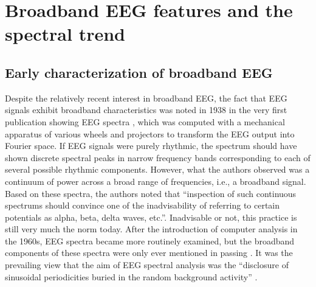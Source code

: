 \section{Broadband EEG features and the spectral trend} \label{sec:phenomenon}
\subsection{Early characterization of broadband EEG}
Despite the relatively recent interest in broadband EEG, the fact that EEG signals exhibit broadband characteristics was noted in 1938 in the very first publication showing EEG spectra \cite{Grass1938}, which was computed with a mechanical apparatus of various wheels and projectors to transform the EEG output into Fourier space. If EEG signals were purely rhythmic, the spectrum should have shown discrete spectral peaks in narrow frequency bands corresponding to each of several possible rhythmic components. However, what the authors observed was a continuum of power across a broad range of frequencies, i.e., a broadband signal. Based on these spectra, the authors noted that ``inspection of such continuous spectrums should convince one of the inadvisability of referring to certain potentials as alpha, beta, delta waves, etc.''\cite{Grass1938}. Inadvisable or not, this practice is still very much the norm today. After the introduction of computer analysis in the 1960s, EEG spectra became more routinely examined, but the broadband components of these spectra were only ever mentioned in passing \cite{Boudreau1963}. It was the prevailing view that the aim of EEG spectral analysis was the ``disclosure of sinusoidal periodicities buried in the random background activity'' \cite{Freeman1975}. 

